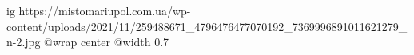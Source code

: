  
 
 
 
 

\ifcmt
  ig https://mistomariupol.com.ua/wp-content/uploads/2021/11/259488671_4796476477070192_7369996891011621279_n-2.jpg
  @wrap center
  @width 0.7
\fi
